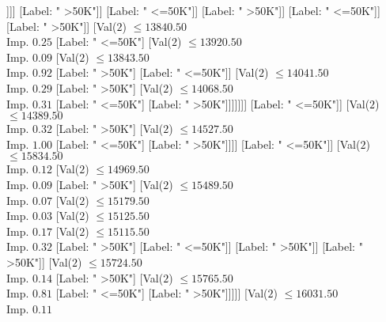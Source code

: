 \documentclass[margin=10pt]{standalone}
\begin{document}
\begin{forest}
																													[Label: " >50K"]
																													[Label: " <=50K"]]]]
																										[Label: " >50K"]]
																									[Label: " <=50K"]]
																								[Label: " >50K"]]
																							[Label: " <=50K"]]
																						[Label: " >50K"]]
																					[Val($2$) $ \leq 13840.50$ \\ Imp. $0.25$
																						[Label: " <=50K"]
																						[Val($2$) $ \leq 13920.50$ \\ Imp. $0.09$
																							[Val($2$) $ \leq 13843.50$ \\ Imp. $0.92$
																								[Label: " >50K"]
																								[Label: " <=50K"]]
																							[Val($2$) $ \leq 14041.50$ \\ Imp. $0.29$
																								[Label: " >50K"]
																								[Val($2$) $ \leq 14068.50$ \\ Imp. $0.31$
																									[Label: " <=50K"]
																									[Label: " >50K"]]]]]]]
																			[Label: " <=50K"]]
																		[Val($2$) $ \leq 14389.50$ \\ Imp. $0.32$
																			[Label: " >50K"]
																			[Val($2$) $ \leq 14527.50$ \\ Imp. $1.00$
																				[Label: " <=50K"]
																				[Label: " >50K"]]]]
																	[Label: " <=50K"]]
																[Val($2$) $ \leq 15834.50$ \\ Imp. $0.12$
																	[Val($2$) $ \leq 14969.50$ \\ Imp. $0.09$
																		[Label: " >50K"]
																		[Val($2$) $ \leq 15489.50$ \\ Imp. $0.07$
																			[Val($2$) $ \leq 15179.50$ \\ Imp. $0.03$
																				[Val($2$) $ \leq 15125.50$ \\ Imp. $0.17$
																					[Val($2$) $ \leq 15115.50$ \\ Imp. $0.32$
																						[Label: " >50K"]
																						[Label: " <=50K"]]
																					[Label: " >50K"]]
																				[Label: " >50K"]]
																			[Val($2$) $ \leq 15724.50$ \\ Imp. $0.14$
																				[Label: " >50K"]
																				[Val($2$) $ \leq 15765.50$ \\ Imp. $0.81$
																					[Label: " <=50K"]
																					[Label: " >50K"]]]]]
																	[Val($2$) $ \leq 16031.50$ \\ Imp. $0.11$

\end{forest}
\end{document}
